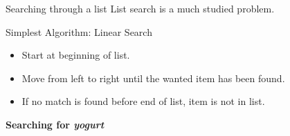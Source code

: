 \documentclass[professionalfonts, xcolor={usenames,svgnames,x11names,table}]{beamer}
\begin{document}
\begin{frame}{Searching through a list}
    List search is a much studied problem.
    \begin{block}{Simplest Algorithm: Linear Search}
        \begin{itemize}
            \item Start at beginning of list.
            \item Move from left to right until the wanted item has been found.
            \item If no match is found before end of list, item is not in list.
        \end{itemize}
    \end{block}

    \pause
    \textbf{Searching for \emph{yogurt}}
    \begin{center}
    \end{center}
\end{frame}
\end{document}
